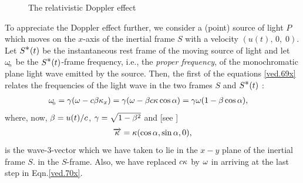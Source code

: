 \begin{figure}[H]
\begin{center}
\end{center}
\caption{The relativistic Doppler effect}\label{fig8.1}
\end{figure}
To appreciate the Doppler effect further, we consider a 
(point) source of light $P$ which moves on the $x$-axis of 
the inertial frame $S$ with a velocity  $(u(t),\,0,\;0)$. 
Let $S^{{\textstyle \ast}}(t)$ be the instantaneous rest frame of the 
moving source of light and let $ {\omega}_{_{\hspace*{-1.5pt}{0}}}$ be the 
$S^{{\textstyle \ast}}(t)$-frame frequency, i.e., the \textsl{proper 
frequency}, of the monochromatic plane light wave  
emitted by the source. Then, the first of the equations 
\eqref{ved.69x} relates the frequencies of the light wave 
in the two frames $S$ and $S^{{\textstyle \ast}}(t)$ :
\begin{align}\label{ved.70x}
{\omega}_{_{\hspace*{-1.5pt}{0}}} 
&=\gamma({\omega} -c {\beta}{\kappa}_x) 
=\gamma({\omega}-{\beta} c{\kappa}\cos{\alpha}) = 
\gamma{\omega}(1-{\beta}\cos{\alpha}),
\end{align}
where, now,  ${\beta}=u(t)/c $, $\gamma=\sqrt{1- {\beta}^2}$ and 
[see ]
\begin{align}\label{ved.71x}
\overrightarrow{{\kappa}}= {\kappa} (\cos{\alpha}, \sin{\alpha}, 0) ,
\end{align}
is the wave-3-vector which we have taken to lie in the 
$x-y$ 
plane of the inertial frame $S$. in the $S$-frame. Also, we 
have replaced $c{\kappa}$ by  ${\omega}$ in arriving at the last 
step in Eqn.\eqref{ved.70x}.


